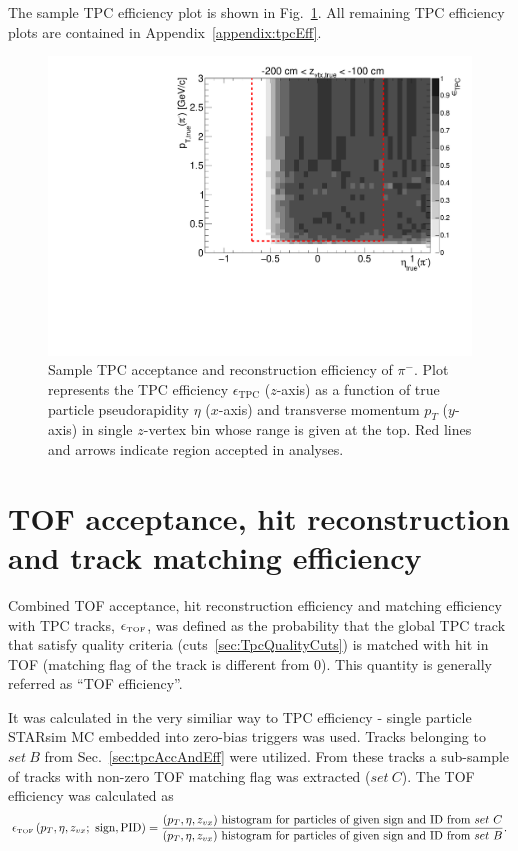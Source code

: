 The sample TPC efficiency plot is shown in Fig.~\ref{fig:tpcEff_pion_sample}. All remaining TPC efficiency plots are contained in Appendix~\ref{appendix:tpcEff}.

\begin{figure}[hb]%
\centering\includegraphics[width=0.7\linewidth,page=11]{graphics/eff/Eff2D_TPC_pion_Minus.pdf}%
\caption[Sample TPC acceptance and reconstruction efficiency of $\pi^{-}$.]{Sample TPC acceptance and reconstruction efficiency of $\pi^{-}$. Plot represents the TPC efficiency $\epsilon_{\text{TPC}}$ ($z$-axis) as a function of true particle pseudorapidity $\eta$ ($x$-axis) and transverse momentum $p_{T}$ ($y$-axis) in single $z$-vertex bin whose range is given at the top. Red lines and arrows indicate region accepted in analyses.}\label{fig:tpcEff_pion_sample}
\end{figure}






\section{TOF acceptance, hit reconstruction and track matching efficiency}\label{sec:tofMatchEff}

Combined TOF acceptance, hit reconstruction efficiency and matching efficiency with TPC tracks, $\epsilon_{\textrm{\tiny TOF}}$, was defined as the probability that the global TPC track that satisfy quality criteria (cuts~\ref{sec:TpcQualityCuts}) is matched with hit in TOF (matching flag of the track is different from 0). This quantity is generally referred as ``TOF efficiency''.

It was calculated in the very similiar way to TPC efficiency - single particle STARsim MC embedded into zero-bias triggers was used. Tracks belonging to $set~B$ from Sec.~\ref{sec:tpcAccAndEff} were utilized. From these tracks a sub-sample of tracks with non-zero TOF matching flag was extracted ($set~C$). The TOF efficiency was calculated as
\begin{equation}\label{eq:tofAccAndEffDefinition}
		\epsilon_{\textrm{\tiny TOF}}\left(p_{T}, \eta, z_{vx};~\textrm{sign},\textrm{PID}\right) = \frac{(p_{T},\eta, z_{vx})~\textrm{histogram for particles of given sign and ID from}~set~C}{(p_{T},\eta, z_{vx})~\textrm{histogram for particles of given sign and ID from}~set~B}.
	\end{equation}

